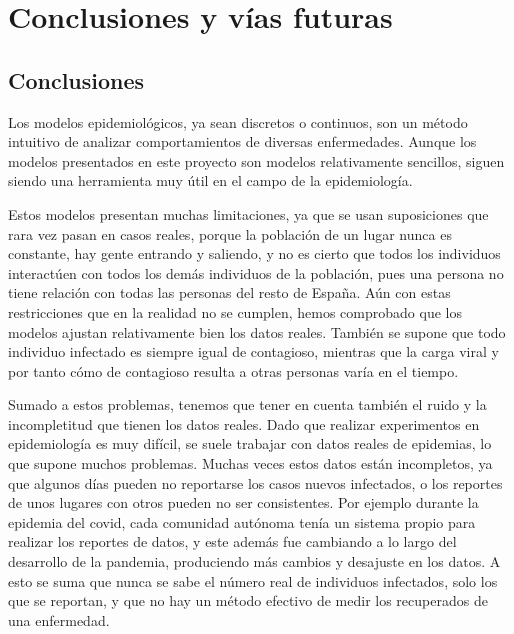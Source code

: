 
\chapter{Conclusiones y vías futuras}

\section{Conclusiones}

Los modelos epidemiológicos, ya sean discretos o continuos, son un método intuitivo de analizar comportamientos de diversas enfermedades. Aunque los modelos presentados en este proyecto son modelos relativamente sencillos, siguen siendo una herramienta muy útil en el campo de la epidemiología.

Estos modelos presentan muchas limitaciones, ya que se usan suposiciones que rara vez pasan en casos reales, porque la población de un lugar nunca es constante, hay gente entrando y saliendo, y no es cierto que todos los individuos interactúen con todos los demás individuos de la población, pues una persona no tiene relación con todas las personas del resto de España. Aún con estas restricciones que en la realidad no se cumplen, hemos comprobado que los modelos ajustan relativamente bien los datos reales. También se supone que todo individuo infectado es siempre igual de contagioso, mientras que la carga viral y por tanto cómo de contagioso resulta a otras personas varía en el tiempo.

Sumado a estos problemas, tenemos que tener en cuenta también el ruido y la incompletitud que tienen los datos reales. Dado que realizar experimentos en epidemiología es muy difícil, se suele trabajar con datos reales de epidemias, lo que supone muchos problemas. Muchas veces estos datos están incompletos, ya que algunos días pueden no reportarse los casos nuevos infectados, o los reportes de unos lugares con otros pueden no ser consistentes. Por ejemplo durante la epidemia del covid, cada comunidad autónoma tenía un sistema propio para realizar los reportes de datos, y este además fue cambiando a lo largo del desarrollo de la pandemia, produciendo más cambios y desajuste en los datos. A esto se suma que nunca se sabe el número real de individuos infectados, solo los que se reportan, y que no hay un método efectivo de medir los recuperados de una enfermedad.

